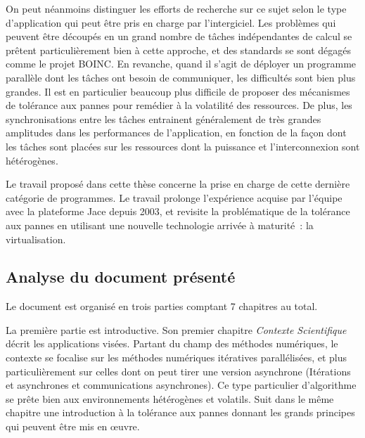 \documentclass[a4paper,12pt]{article}
\begin{document}
On peut néanmoins distinguer les efforts de recherche sur ce sujet 
selon le type d'application qui peut être pris en charge par 
l'intergiciel. Les problèmes qui peuvent être découpés en un grand
nombre de tâches indépendantes de calcul se prêtent particulièrement
bien à cette approche, et des standards se sont dégagés comme le 
projet BOINC. En revanche, quand il s'agit de déployer un programme
parallèle dont les tâches ont besoin de communiquer, les difficultés
sont bien plus grandes. Il est en particulier beaucoup plus difficile
de proposer des mécanismes de tolérance aux pannes pour remédier à
la volatilité des ressources. De plus, les synchronisations entre
les tâches entrainent généralement de très grandes amplitudes dans les 
performances de l'application, en fonction de la façon dont les tâches
sont placées sur les ressources dont la puissance et l'interconnexion
sont hétérogènes.

Le travail proposé dans cette thèse concerne la prise en charge de cette 
dernière catégorie de programmes. Le travail prolonge l'expérience acquise
par l'équipe avec la plateforme Jace depuis 2003, et revisite la
problématique de la tolérance aux pannes en utilisant une nouvelle technologie
arrivée à maturité~: la virtualisation.


\subsection*{Analyse du document présenté}
\vspace{-3mm}
Le document est organisé en trois parties comptant 7 chapitres au total.

La première partie est introductive. Son premier chapitre \textit{Contexte
Scientifique} décrit les applications visées. Partant du champ des méthodes 
numériques, le contexte se focalise sur les méthodes numériques itératives
parallélisées, et plus particulièrement sur celles dont on peut tirer une
version asynchrone (Itérations et asynchrones et communications asynchrones). 
Ce type particulier d'algorithme se prête bien aux environnements hétérogènes
et volatils. Suit dans le même chapitre une introduction à la tolérance
aux pannes donnant les grands principes qui peuvent être mis en {\oe}uvre.
\end{document}
